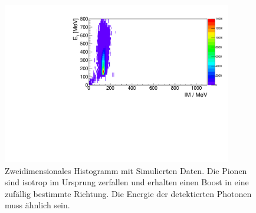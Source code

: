 \documentclass[a4paper,11pt,oneside,final,german,openbib,pdftex]{scrbook}
\begin{document}
{\begin{appendix}

\begin{figure}[h!]
	\begin{center}
		\includegraphics[width=100mm]{NewCalib/UrsprungIsotrop/20171904SimUrsprungIsotropNoCutHist}
		\caption[Simulation: 2D-Hist Isotroper Boost im Ursprung ]{Zweidimensionales Histogramm mit Simulierten Daten. Die Pionen sind isotrop im Ursprung zerfallen und erhalten einen Boost in eine zuf\"allig bestimmte Richtung. Die Energie der detektierten Photonen muss \"ahnlich sein.}
		\label{fig:Sim-Data-Ursprung-2DHist-No-Cut}
	\end{center}
\end{figure}

\end{appendix}}
\end{document}
